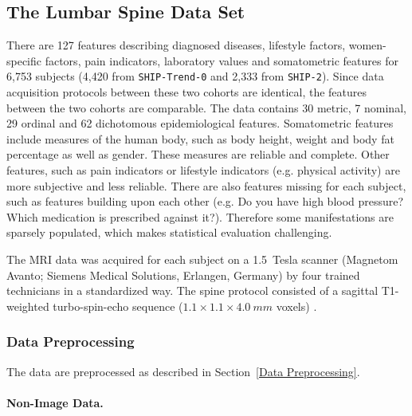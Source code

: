 \documentclass[journal]{style/vgtc} 			          %
\begin{document}
\subsection{The Lumbar Spine Data Set}
%
There are 127 features describing diagnosed diseases, lifestyle factors, women-specific factors, pain indicators, laboratory values and somatometric features for 6,753 subjects (4,420 from \texttt{SHIP-Trend-0} and 2,333 from \texttt{SHIP-2}).
%
Since data acquisition protocols between these two cohorts are identical, the features between the two cohorts are comparable.
%
The data contains 30 metric, 7 nominal, 29 ordinal and 62 dichotomous epidemiological features.
%
Somatometric features include measures of the human body, such as body height, weight and body fat percentage as well as gender.
%
These measures are reliable and complete.
%
Other features, such as pain indicators or lifestyle indicators (e.g. physical activity) are more subjective and less reliable.
%
There are also features missing for each subject, such as features building upon each other (e.g. Do you have high blood pressure? Which medication is prescribed against it?).
%
Therefore some manifestations are sparsely populated, which makes statistical evaluation challenging.
%
%

The MRI data was acquired for each subject on a 1.5~Tesla scanner (Magnetom Avanto; Siemens Medical Solutions, Erlangen, Germany) by four trained technicians in a standardized way.
%
The spine protocol consisted of a sagittal T1-weighted turbo-spin-echo sequence ($1.1\times1.1\times4.0~mm$ voxels) \cite{Hegenscheid2013}. %

\subsubsection{Data Preprocessing} \label{application:Data Preprocessing}
The data are preprocessed as described in Section~\ref{Data Preprocessing}.
%
\paragraph{Non-Image Data.} 
\end{document}
